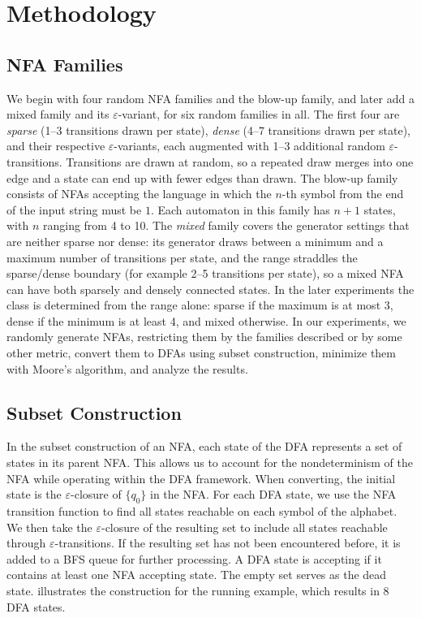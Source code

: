 \documentclass[9pt]{ieeeconf}
\begin{document}
\section{Methodology}
\label{sec:methodology}

\subsection{NFA Families}
\label{sec:families}

We begin with four random NFA families and the blow-up family, and later add a mixed family and its $\varepsilon$-variant, for six random families in all. The first four are \emph{sparse} (1--3 transitions drawn per state), \emph{dense} (4--7 transitions drawn per state), and their respective $\varepsilon$-variants, each augmented with 1--3 additional random $\varepsilon$-transitions. Transitions are drawn at random, so a repeated draw merges into one edge and a state can end up with fewer edges than drawn. The blow-up family consists of NFAs accepting the language in which the $n$-th symbol from the end of the input string must be $1$. Each automaton in this family has $n+1$ states, with $n$ ranging from 4 to 10. The \emph{mixed} family covers the generator settings that are neither sparse nor dense: its generator draws between a minimum and a maximum number of transitions per state, and the range straddles the sparse/dense boundary (for example 2--5 transitions per state), so a mixed NFA can have both sparsely and densely connected states. In the later experiments the class is determined from the range alone: sparse if the maximum is at most 3, dense if the minimum is at least 4, and mixed otherwise. In our experiments, we randomly generate NFAs, restricting them by the families described or by some other metric, convert them to DFAs using subset construction, minimize them with Moore's algorithm, and analyze the results.

\subsection{Subset Construction}
In the subset construction of an NFA, each state of the DFA represents a set of states in its parent NFA. This allows us to account for the nondeterminism of the NFA while operating within the DFA framework. When converting, the initial state is the $\varepsilon$-closure of $\{q_0\}$ in the NFA. For each DFA state, we use the NFA transition function to find all states reachable on each symbol of the alphabet. We then take the $\varepsilon$-closure of the resulting set to include all states reachable through $\varepsilon$-transitions. If the resulting set has not been encountered before, it is added to a BFS queue for further processing. A DFA state is accepting if it contains at least one NFA accepting state. The empty set serves as the dead state.  illustrates the construction for the running example, which results in 8 DFA states.
\end{document}
